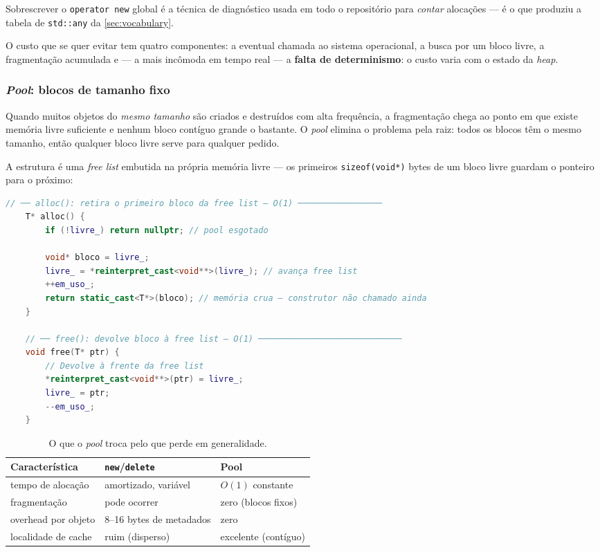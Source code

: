 Sobrescrever o \texttt{operator new} global é a técnica de diagnóstico usada em
todo o repositório para \emph{contar} alocações --- é o que produziu a tabela de
\texttt{std::any} da \cref{sec:vocabulary}.

O custo que se quer evitar tem quatro componentes: a eventual chamada ao sistema
operacional, a busca por um bloco livre, a fragmentação acumulada e --- a mais
incômoda em tempo real --- a \textbf{falta de determinismo}: o custo varia com o
estado da \emph{heap}.

\subsubsection{\emph{Pool}: blocos de tamanho fixo}

Quando muitos objetos do \emph{mesmo tamanho} são criados e destruídos com alta
frequência, a fragmentação chega ao ponto em que existe memória livre suficiente
e nenhum bloco contíguo grande o bastante. O \emph{pool} elimina o problema pela
raiz: todos os blocos têm o mesmo tamanho, então qualquer bloco livre serve para
qualquer pedido.

A estrutura é uma \emph{free list} embutida na própria memória livre --- os
primeiros \texttt{sizeof(void*)} bytes de um bloco livre guardam o ponteiro para
o próximo:

\begin{lstlisting}[style=bt, language=C++,
    caption={As duas operações centrais, em
             \texttt{src/memory/demo\_pool\_allocator.hpp}.}]
    // ── alloc(): retira o primeiro bloco da free list — O(1) ─────────────────
    T* alloc() {
        if (!livre_) return nullptr; // pool esgotado

        void* bloco = livre_;
        livre_ = *reinterpret_cast<void**>(livre_); // avança free list
        ++em_uso_;
        return static_cast<T*>(bloco); // memória crua — construtor não chamado ainda
    }

    // ── free(): devolve bloco à free list — O(1) ─────────────────────────────
    void free(T* ptr) {
        // Devolve à frente da free list
        *reinterpret_cast<void**>(ptr) = livre_;
        livre_ = ptr;
        --em_uso_;
    }
\end{lstlisting}

\begin{table}[htbp]
\centering
\caption{O que o \emph{pool} troca pelo que perde em generalidade.}
\label{tab:pool}
\footnotesize
\begin{tabular}{@{}lll@{}}
\toprule
\textbf{Característica} & \texttt{new}/\texttt{delete} & \textbf{Pool} \\
\midrule
tempo de alocação    & amortizado, variável   & $O(1)$ constante \\
fragmentação         & pode ocorrer           & zero (blocos fixos) \\
overhead por objeto  & 8--16 bytes de metadados & zero \\
localidade de cache  & ruim (disperso)        & excelente (contíguo) \\
\bottomrule
\end{tabular}
\end{table}

